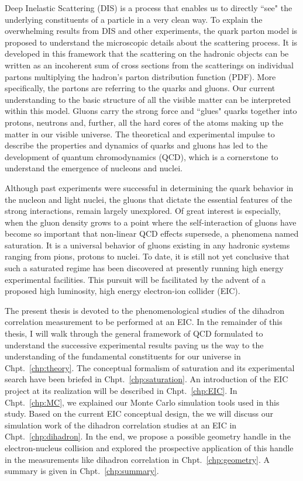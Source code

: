 Deep Inelastic Scattering (DIS) is a process that enables us to directly ``see"
the underlying constituents of a particle in a very clean way. To explain the
overwhelming results from DIS and other experiments, the quark parton model is
proposed to understand the microscopic details about the scattering process. It
is developed in this framework that the scattering on the hadronic objects can
be written as an incoherent sum of cross sections from the scatterings on
individual partons multiplying the hadron's parton distribution function (PDF).
More specifically, the partons are referring to the quarks and gluons. Our
current understanding to the basic structure of all the visible matter can be
interpreted within this model. Gluons carry the strong force and
``glues" quarks together into protons, neutrons and, further, all the hard
cores of the atoms making up the matter in our visible universe. The theoretical
and experimental impulse to describe the properties and dynamics of quarks and
gluons has led to the development of quantum chromodynamics (QCD), which is a
cornerstone to understand the emergence of nucleons and nuclei.


Although past experiments were successful in determining the quark behavior in
the nucleon and light nuclei, the gluons that dictate the essential features
of the strong interactions, remain largely unexplored. Of great interest is
especially, when the gluon density grows to a point where the self-interaction
of gluons have become so important that non-linear QCD effects supersede, a
phenomena named saturation. It is a universal behavior of gluons existing in any
hadronic systems ranging from pions, protons to nuclei. To date, it is still not
yet conclusive that such a saturated regime has been discovered at presently
running high energy experimental facilities. This pursuit will be facilitated by
the advent of a proposed high luminosity, high energy electron-ion collider (EIC).


The present thesis is devoted to the phenomenological studies of the dihadron
correlation measurement to be performed at an EIC. In the remainder of this
thesis, I will walk through the general framework of QCD formulated to
understand the successive experimental results paving us the way to the
understanding of the fundamental constituents for our universe in
Chpt.~\ref{chp:theory}. The conceptual formalism of saturation and its
experimental search have been briefed in Chpt.~\ref{chp:saturation}. An
introduction of the EIC project at its realization will be described in
Chpt.~\ref{chp:EIC}. In Chpt.~\ref{chp:MC}, we explained our Monte Carlo
simulation tools used in this study. Based on the current EIC conceptual design,
the we will discuss our simulation work of the dihadron correlation studies at
an EIC in Chpt.~\ref{chp:dihadron}. In the end, we propose a possible geometry
handle in the electron-nucleus collision and explored the prospective
application of this handle in the measurements like dihadron correlation in
Chpt.~\ref{chp:geometry}. A summary is given in Chpt.~\ref{chp:summary}.

